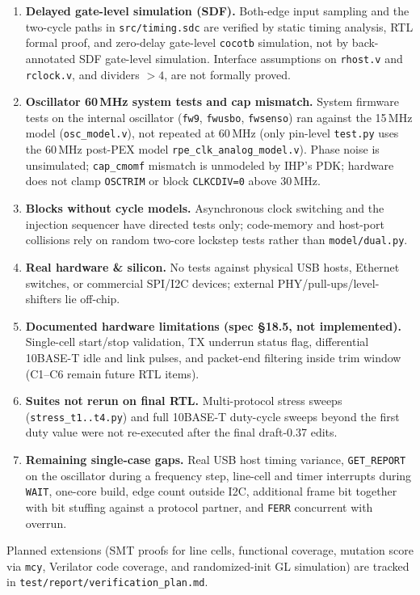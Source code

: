 \documentclass[10pt,a4paper]{article}
\begin{document}
\begin{enumerate}
\item \textbf{Delayed gate-level simulation (SDF).} Both-edge input sampling and the two-cycle paths in
\texttt{src/timing.sdc} are verified by static timing analysis, RTL formal proof, and zero-delay gate-level
\texttt{cocotb} simulation, not by back-annotated SDF gate-level simulation. Interface assumptions on
\texttt{rhost.v} and \texttt{rclock.v}, and dividers $>4$, are not formally proved.
\item \textbf{Oscillator 60\,MHz system tests and cap mismatch.} System firmware tests on the internal oscillator
(\texttt{fw9}, \texttt{fwusbo}, \texttt{fwsenso}) ran against the 15\,MHz model (\texttt{osc\_model.v}), not repeated
at 60\,MHz (only pin-level \texttt{test.py} uses the 60\,MHz post-PEX model \texttt{rpe\_clk\_analog\_model.v}). Phase
noise is unsimulated; \texttt{cap\_cmomf} mismatch is unmodeled by IHP's PDK; hardware does not clamp \texttt{OSCTRIM}
or block \texttt{CLKCDIV=0} above 30\,MHz.
\item \textbf{Blocks without cycle models.} Asynchronous clock switching and the injection sequencer have directed
tests only; code-memory and host-port collisions rely on random two-core lockstep tests rather than \texttt{model/dual.py}.
\item \textbf{Real hardware \& silicon.} No tests against physical USB hosts, Ethernet switches, or commercial
SPI/I2C devices; external PHY/pull-ups/level-shifters lie off-chip.
\item \textbf{Documented hardware limitations (spec \S 18.5, not implemented).} Single-cell start/stop validation,
TX underrun status flag, differential 10BASE-T idle and link pulses, and packet-end filtering inside trim window
(C1--C6 remain future RTL items).
\item \textbf{Suites not rerun on final RTL.} Multi-protocol stress sweeps (\texttt{stress\_t1..t4.py}) and full
10BASE-T duty-cycle sweeps beyond the first duty value were not re-executed after the final draft-0.37 edits.
\item \textbf{Remaining single-case gaps.} Real USB host timing variance, \texttt{GET\_REPORT} on the oscillator during
a frequency step, line-cell and timer interrupts during \texttt{WAIT}, one-core build, edge count outside I2C,
additional frame bit together with bit stuffing against a protocol partner, and \texttt{FERR} concurrent with overrun.
\end{enumerate}

Planned extensions (SMT proofs for line cells, functional coverage, mutation score via \texttt{mcy}, Verilator code
coverage, and randomized-init GL simulation) are tracked in \texttt{test/report/verification\_plan.md}.
\end{document}
